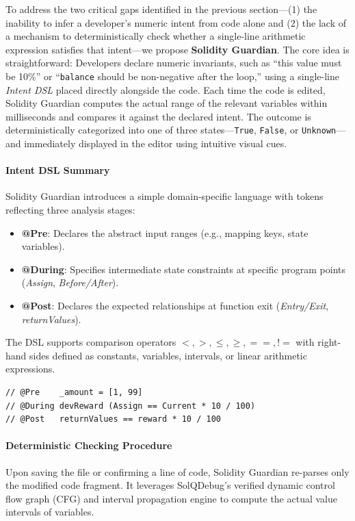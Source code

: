 \documentclass[10pt, conference]{IEEEtran}
\begin{document}
To address the two critical gaps identified in the previous section—(1) the inability to infer a developer's numeric intent from code alone and (2) the lack of a mechanism to deterministically check whether a single-line arithmetic expression satisfies that intent—we propose \textbf{Solidity Guardian}. The core idea is straightforward:  
Developers declare numeric invariants, such as ``this value must be 10\%'' or ``\texttt{balance} should be non-negative after the loop,'' using a single-line \textit{Intent DSL} placed directly alongside the code. Each time the code is edited, Solidity Guardian computes the actual range of the relevant variables within milliseconds and compares it against the declared intent. The outcome is deterministically categorized into one of three states—\texttt{True}, \texttt{False}, or \texttt{Unknown}—and immediately displayed in the editor using intuitive visual cues.

\paragraph{Intent DSL Summary}
Solidity Guardian introduces a simple domain-specific language with tokens reflecting three analysis stages:
\begin{itemize}
    \item \textbf{@Pre}: Declares the abstract input ranges (e.g., mapping keys, state variables).
    \item \textbf{@During}: Specifies intermediate state constraints at specific program points (\textit{Assign}, \textit{Before/After}).
    \item \textbf{@Post}: Declares the expected relationships at function exit (\textit{Entry/Exit}, \textit{returnValues}).
\end{itemize}

The DSL supports comparison operators $<, >, \leq, \geq, ==, !=$ with right-hand sides defined as constants, variables, intervals, or linear arithmetic expressions.

\begin{lstlisting}[language=Solidity]
// @Pre    _amount = [1, 99]
// @During devReward (Assign == Current * 10 / 100)
// @Post   returnValues == reward * 10 / 100
\end{lstlisting}

\paragraph{Deterministic Checking Procedure}
Upon saving the file or confirming a line of code, Solidity Guardian re-parses only the modified code fragment. It leverages SolQDebug's verified dynamic control flow graph (CFG) and interval propagation engine to compute the actual value intervals of variables.
\end{document}
